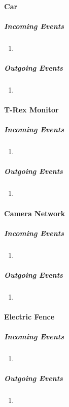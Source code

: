 \documentclass[12pt]{article}
\begin{document}
		\paragraph{Car}
		\textit{}
			\subparagraph{Incoming Events}
				\begin{enumerate}
					\item 
				\end{enumerate}
				
			\subparagraph{Outgoing Events}
				\begin{enumerate}
					\item 
				\end{enumerate}

		\paragraph{T-Rex Monitor}
		\textit{}
			\subparagraph{Incoming Events}
				\begin{enumerate}
					\item 
				\end{enumerate}
				
			\subparagraph{Outgoing Events}
				\begin{enumerate}
					\item 
				\end{enumerate}

		\paragraph{Camera Network}
		\textit{}
			\subparagraph{Incoming Events}
				\begin{enumerate}
					\item 
				\end{enumerate}
				
			\subparagraph{Outgoing Events}
				\begin{enumerate}
					\item 
				\end{enumerate}

		\paragraph{Electric Fence}
		\textit{}
			\subparagraph{Incoming Events}
				\begin{enumerate}
					\item 
				\end{enumerate}
				
			\subparagraph{Outgoing Events}
				\begin{enumerate}
					\item 
				\end{enumerate}
\end{document}
